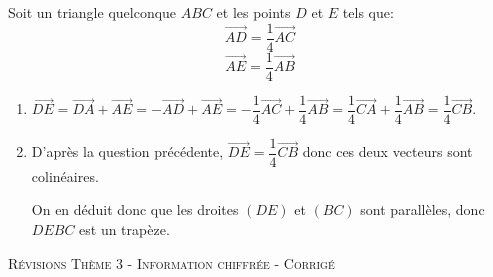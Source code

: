 \documentclass[a4paper]{article}
\begin{document}
\begin{exercice}{}{}
      Soit un triangle quelconque $ABC$ et les points $D$ et $E$ tels que:
     $$\overrightarrow{AD}=\dfrac{1}{4}\overrightarrow{AC}$$
    $$\overrightarrow{AE}=\dfrac{1}{4}\overrightarrow{AB}$$
    \begin{enumerate}
        \item $\overrightarrow{DE}=\overrightarrow{DA}+\overrightarrow{AE}=-\overrightarrow{AD}+\overrightarrow{AE}=-\dfrac{1}{4}\overrightarrow{AC}+\dfrac{1}{4}\overrightarrow{AB}
        =\dfrac{1}{4}\overrightarrow{CA}+\dfrac{1}{4}\overrightarrow{AB}=\dfrac{1}{4}\overrightarrow{CB}$.
        \item D'après la question précédente, $\overrightarrow{DE}=\dfrac{1}{4}\overrightarrow{CB}$ donc ces deux vecteurs sont colinéaires.
        
        On en déduit donc que les droites $(DE)$ et $(BC)$ sont parallèles, donc $DEBC$ est un trapèze.
    \end{enumerate}  
    
        
    \end{exercice}
    
    
    \pagebreak



\begin{center}
    {\scshape\LARGE Révisions Thème 3 - Information chiffrée - Corrigé\par}
    \vspace{0.5cm}
  \end{center}

  \setcounter{exercice}{0}
\end{document}
